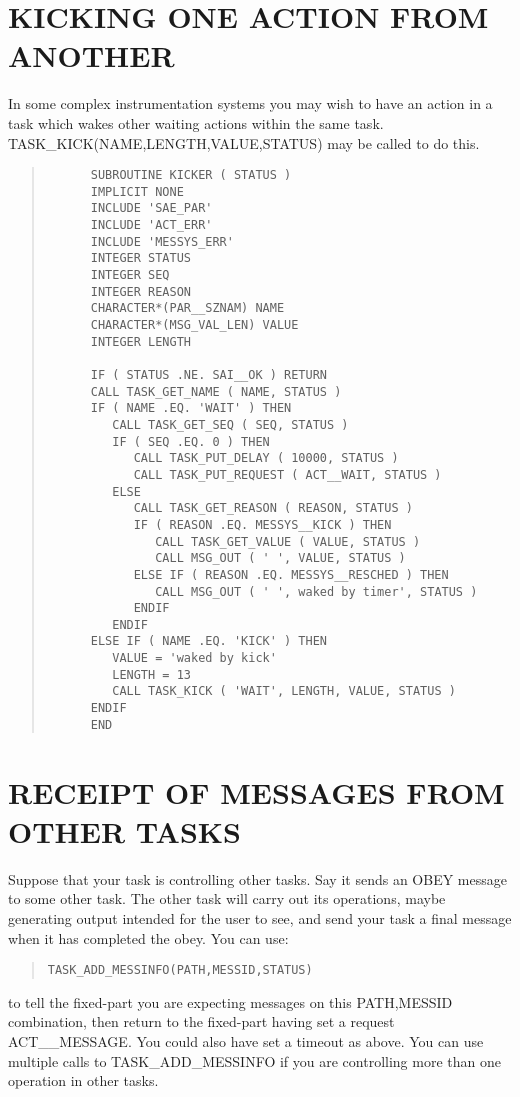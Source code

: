 \section{KICKING ONE ACTION FROM ANOTHER}

In some complex instrumentation systems you may wish to have an action in a
task which wakes other waiting actions within the same task.
TASK\_KICK(NAME,LENGTH,VALUE,STATUS) may be called to do this.

\small \begin{quote} \begin{verbatim}
      SUBROUTINE KICKER ( STATUS )
      IMPLICIT NONE
      INCLUDE 'SAE_PAR'
      INCLUDE 'ACT_ERR'
      INCLUDE 'MESSYS_ERR'
      INTEGER STATUS
      INTEGER SEQ
      INTEGER REASON
      CHARACTER*(PAR__SZNAM) NAME
      CHARACTER*(MSG_VAL_LEN) VALUE
      INTEGER LENGTH

      IF ( STATUS .NE. SAI__OK ) RETURN
      CALL TASK_GET_NAME ( NAME, STATUS )
      IF ( NAME .EQ. 'WAIT' ) THEN
         CALL TASK_GET_SEQ ( SEQ, STATUS )
         IF ( SEQ .EQ. 0 ) THEN
            CALL TASK_PUT_DELAY ( 10000, STATUS )
            CALL TASK_PUT_REQUEST ( ACT__WAIT, STATUS )
         ELSE
            CALL TASK_GET_REASON ( REASON, STATUS )
            IF ( REASON .EQ. MESSYS__KICK ) THEN
               CALL TASK_GET_VALUE ( VALUE, STATUS )
               CALL MSG_OUT ( ' ', VALUE, STATUS )
            ELSE IF ( REASON .EQ. MESSYS__RESCHED ) THEN
               CALL MSG_OUT ( ' ', waked by timer', STATUS )
            ENDIF
         ENDIF
      ELSE IF ( NAME .EQ. 'KICK' ) THEN
         VALUE = 'waked by kick'
         LENGTH = 13
         CALL TASK_KICK ( 'WAIT', LENGTH, VALUE, STATUS )
      ENDIF
      END
\end{verbatim} \end{quote} \normalsize



\section{RECEIPT OF MESSAGES FROM OTHER TASKS}

Suppose that your task is controlling other tasks. Say it sends an OBEY
message to some other task. The other task will carry out its
operations, maybe generating output intended for the user to see, and
send your task a final message when it has completed the obey. You can
use: 
\small \begin{quote} \begin{verbatim}
TASK_ADD_MESSINFO(PATH,MESSID,STATUS)
\end{verbatim} \end{quote} \normalsize
to tell the fixed-part you are 
expecting messages on this PATH,MESSID combination, then return to the 
fixed-part having set a request ACT\_\_MESSAGE. You could also have set a 
timeout as above. You can use multiple calls to TASK\_ADD\_MESSINFO if you 
are controlling more than one operation in other tasks.

